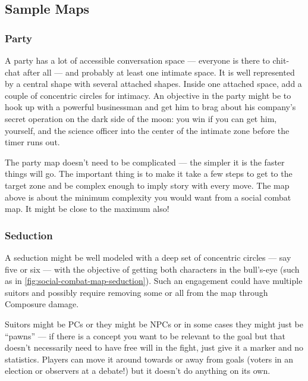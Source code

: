 
\subsection{Sample Maps}\label{sec:Sample Maps}


\subsubsection{Party}

A party has a lot of accessible conversation space --- everyone is there to chit-chat after all --- and probably at least one intimate space. It is well represented by a central shape with several attached shapes. Inside one attached space, add a couple of concentric circles for intimacy. An objective in the party might be to hook up with a powerful businessman and get him to brag about his company's secret operation on the dark side of the moon: you win if you can get him, yourself, and the science officer into the center of the intimate zone before the timer runs out.

The party map doesn't need to be complicated --- the simpler it is the faster things will go. The important thing is to make it take a few steps to get to the target zone and be complex enough to imply story with every move. The map above is about the minimum complexity you would want from a social combat map. It might be close to the maximum also!

\clearpage


\subsubsection{Seduction}



A seduction might be well modeled with a deep set of concentric circles --- say five or six --- with the objective of getting both characters in the bull's-eye (such as in \autoref{fig:social-combat-map-seduction}). Such an engagement could have multiple suitors and possibly require removing some or all from the map through Composure damage.


Suitors might be PCs or they might be NPCs or in some cases they might just be ``pawns'' --- if there is a concept you want to be relevant to the goal but that doesn't necessarily need to have free will in the fight, just give it a marker and no statistics. Players can move it around towards or away from goals (voters in an election or observers at a debate!) but it doesn't do anything on its own.

